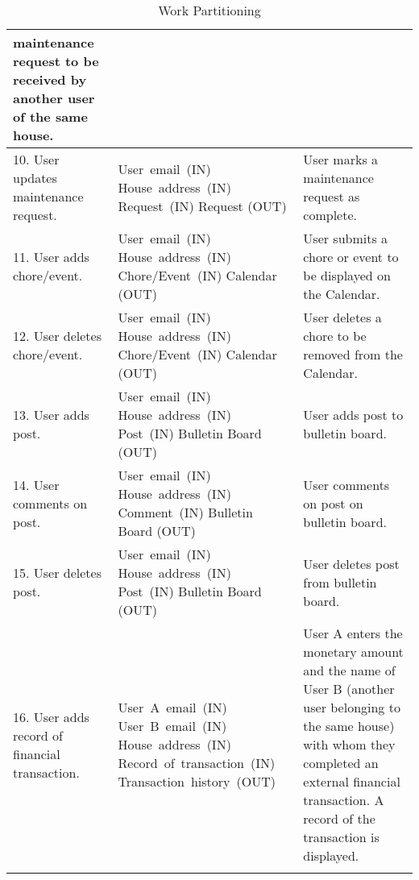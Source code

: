 \documentclass[12pt]{article}
\begin{document}
\begin{longtable}{|p{5cm}|p{5cm}|p{5cm}|}
maintenance request to be received by another user of the same house. \\
\hline
10. User updates maintenance request. & \mbox{User email (IN)} \linebreak \mbox{House address (IN)} \linebreak \mbox{Request (IN)} \linebreak Request (OUT) & User marks a maintenance request as complete. \\
\hline
11. User adds chore/event. & \mbox{User email (IN)} \linebreak \mbox{House address (IN)} \linebreak\mbox{Chore/Event (IN)} 
\linebreak Calendar (OUT) & User submits a chore or event to be displayed 
on the Calendar. \\ \hline
12. User deletes chore/event. & \mbox{User email (IN)} \linebreak \mbox{House address (IN)} \linebreak\mbox{Chore/Event (IN)} 
\linebreak Calendar (OUT) & User deletes a chore to be removed from the Calendar. \\
\hline
13. User adds post. & \mbox{User email (IN)} \linebreak \mbox{House address (IN)} \linebreak\mbox{Post (IN)} \linebreak 
Bulletin Board (OUT) & User adds post to bulletin board. \\
\hline
14. User comments on post. & \mbox{User email (IN)} \linebreak \mbox{House address (IN)} \linebreak\mbox{Comment (IN)} 
\linebreak Bulletin Board (OUT) & User comments on post on bulletin board. 
\\
\hline
15. User deletes post. & \mbox{User email (IN)} \linebreak \mbox{House address (IN)} \linebreak\mbox{Post (IN)} \linebreak 
Bulletin Board (OUT) & User deletes post from bulletin board. \\
\hline
16. User adds record of financial transaction. & \mbox{User A email (IN)} \linebreak \mbox{User B email (IN)} \linebreak \mbox{House address (IN)} \linebreak \mbox{Record of transaction (IN)} \linebreak \mbox{Transaction history (OUT)} & User A enters the monetary amount and the name of User B (another user belonging to the same house) with whom they completed an external financial transaction. A record of the transaction is 
displayed. \\
\hline
\caption{Work Partitioning}
\label{tab:workpartition}
\end{longtable}
	
\end{document}
